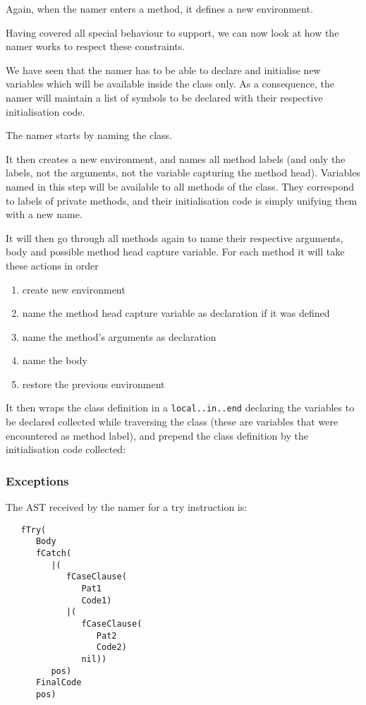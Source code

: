 \documentclass[a4paper]{memoir}
\begin{document}
Again, when the namer enters a method, it defines a new environment.

Having covered all special behaviour to support, we can now look at how the namer works to 
respect these constraints.

We have seen that the namer has to be able to declare and initialise new
variables which will be available inside the class only. As a consequence, the
namer will maintain a list of symbols to be declared with their respective
initialisation code.

The namer starts by naming the class.

It then creates a new environment, and names all method labels (and only the
labels, not the arguments, not the variable capturing the method head).
Variables named in this step will be available to all methods of the class.
They correspond to labels of private methods, and their initialisation code is
simply unifying them with a new name.

It will then go through all methods again to name their respective arguments,
body and possible method head capture variable. For each method it will take
these actions in order
\begin{enumerate}
  \item create new environment
  \item name the method head capture variable as declaration if it was defined
  \item name the method's arguments as declaration
  \item name the body
  \item restore the previous environment
\end{enumerate}

It then wraps the class definition in a \lstinline!local..in..end! declaring the
variables to be declared collected while traversing the class (these are
variables that were encountered as method label), and prepend the class
definition by the initialisation code collected:


\subsubsection{Exceptions}\label{sec:arch:namer:exceptions}
The AST received by the namer for a try instruction is:
\begin{lstlisting}
   fTry(
      Body
      fCatch(
         |(
            fCaseClause(
               Pat1
               Code1)
            |(
               fCaseClause(
                  Pat2
                  Code2)
               nil))
         pos)
      FinalCode
      pos)
\end{lstlisting}
\end{document}
